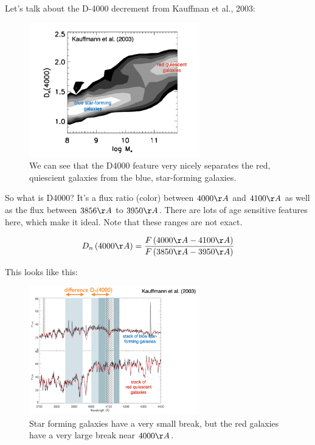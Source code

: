 \documentclass{article}
\begin{document}
Let's talk about the D-4000 decrement from Kauffman et al., 2003:

\begin{figure}
    \centering
    \includegraphics[width=0.66\textwidth]{figs/Screen Shot 2021-09-02 at 9.42.37 AM.png}
    \caption{We can see that the D4000 feature very nicely separates the red, quiescient galaxies from the blue, star-forming galaxies.}
    \label{fig:d4000}
\end{figure}

So what is D4000? It's a flux ratio (color) between $4000\AA$ and $4100\AA$ as well as the flux between $3856\AA$ to $3950\AA$. There are lots of age sensitive features here, which make it ideal. Note that these ranges are not exact.

\begin{equation}
    D_n\left(4000\AA\right) = \frac{F\left(4000\AA-4100\AA\right)}{F\left(3850\AA-3950\AA\right)}
\end{equation}

This looks like this:

\begin{figure}
    \centering
    \includegraphics[width=0.66\textwidth]{figs/Screen Shot 2021-09-02 at 9.42.59 AM.png}
    \caption{Star forming galaxies have a very small break, but the red galaxies have a very large break near $4000\AA$. }
    \label{fig:my_label}
\end{figure}
\end{document}
